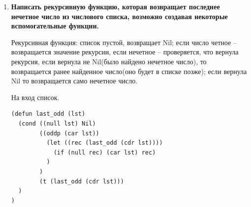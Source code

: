 \documentclass[a4paper,14pt]{extreport} %
\begin{document}
\begin{enumerate}
\textbf{Примеры:}

\begin{lstlisting}
(sumlastN '(1 2 3 4 5 6 7) 5)
\end{lstlisting}

Результат: 18

Дополняемая рекурсия, считающая сумму всех чисел от n-ого аргумента до m-го с шагом d. Используем дополнительную функцию, так как необходимо преобразовать индекс к длине хвоста. Далее просто прибавляются все числа, пропускаются те элементы, где длина хвоста длиннее n, прибавляем голову, где длина хвоста равна n  и далее до m, причем прибавляются только числа позиция которых кратна шагу. 

На вход список и 3 числа, порядок аргументов и шаг. 

\begin{lstlisting}
(defun sum_nextNMD(lst n m d)
  (let ((len (length lst)))
    (cond
      ((= m len)
        (if (= 0 (rem (- n m) 3))
          (car lst)
          0
        )
      )
      ((and (>= n len) (= 0 (rem (- n len) 3)))
        (+ (car lst) (sum_nextNMD (cdr lst) n m d))
      )
      (t
        (sum_nextNMD (cdr lst) n m d)
      )
    )
  )
)

(defun sumNMD(lst n m d)
  (let ((len (length lst)))
    (sum_nextNMD lst (+ 1 (- len n)) (+ 1 (- len m)) d)
  )
)
\end{lstlisting}

\textbf{Примеры:}

\begin{lstlisting}
(sumNMD '(1 2 3 4 5 6 7 8 9 10) 2 9 3)
\end{lstlisting}

Результат: 15

\item \textbf{Написать рекурсивную функцию, которая возвращает последнее нечетное число из числового списка, возможно создавая некоторые вспомогательные функции.}

Рекурсивная функция: список пустой, возвращает Nil; если число четное -- возвращается значение рекурсии, если нечетное -- проверяется, что вернула рекурсия, если вернула не Nil(было найдено нечетное число), то возвращается ранее найденное число(оно будет в списке позже); если вернула Nil то возвращается само нечетное число. 

На вход список. 

\begin{lstlisting}
(defun last_odd (lst)
  (cond ((null lst) Nil)
        ((oddp (car lst))
          (let ((rec (last_odd (cdr lst))))
            (if (null rec) (car lst) rec)
          )
        )
        (t (last_odd (cdr lst)))
  )
)
\end{lstlisting}


\end{enumerate}
\end{document}
